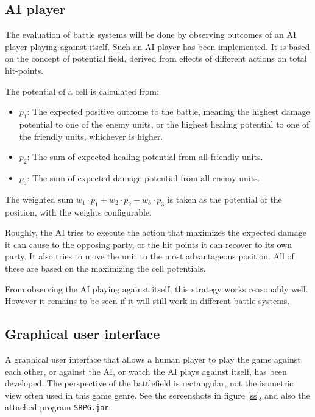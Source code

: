 \documentclass[a4paper,11pt]{article}
\begin{document}
\subsection*{AI player}

The evaluation of battle systems will be done by observing outcomes of an AI player playing against itself. Such an AI player has been implemented. It is based on the concept of potential field, derived from effects of different actions on total hit-points. 

The potential of a cell is calculated from:
\begin{itemize}
	\item $p_1$: The expected positive outcome to the battle, meaning the highest damage potential to one of the enemy units, or the highest healing potential to one of the friendly units, whichever is higher.
	\item $p_2$: The sum of expected healing potential from all friendly units.
	\item $p_3$: The sum of expected damage potential from all enemy units.
\end{itemize}
The weighted sum $w_1 \cdot p_1 + w_2 \cdot p_2 - w_3 \cdot p_3$ is taken as the potential of the position, with the weights configurable.

Roughly, the AI tries to execute the action that maximizes the expected damage it can cause to the opposing party, or the hit points it can recover to its own party. It also tries to move the unit to the most advantageous position. All of these are based on the maximizing the cell potentials.

From observing the AI playing against itself, this strategy works reasonably well. However it remains to be seen if it will still work in different battle systems.

\subsection*{Graphical user interface}

A graphical user interface that allows a human player to play the game against each other, or against the AI, or watch the AI plays against itself, has been developed. The perspective of the battlefield is rectangular, not the isometric view often used in this game genre. See the screenshots in figure \ref{ss}, and also the attached program \texttt{SRPG.jar}.
\end{document}
